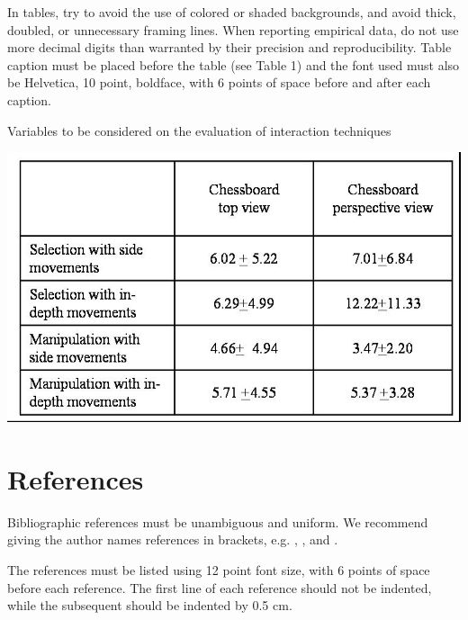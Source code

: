 \documentclass[12pt]{article}
\begin{document}
In tables, try to avoid the use of colored or shaded backgrounds, and avoid
thick, doubled, or unnecessary framing lines. When reporting empirical data,
do not use more decimal digits than warranted by their precision and
reproducibility. Table caption must be placed before the table (see Table 1)
and the font used must also be Helvetica, 10 point, boldface, with 6 points of
space before and after each caption.

\begin{table}[ht]
\centering
\caption{Variables to be considered on the evaluation of interaction
  techniques}
\label{tab:exTable1}
\includegraphics[width=.7\textwidth]{table.jpg}
\end{table}

\section{References}

Bibliographic references must be unambiguous and uniform.  We recommend giving
the author names references in brackets, e.g. \cite{knuth:84},
\cite{boulic:91}, and \cite{smith:99}.

The references must be listed using 12 point font size, with 6 points of space
before each reference. The first line of each reference should not be
indented, while the subsequent should be indented by 0.5 cm.



\end{document}
